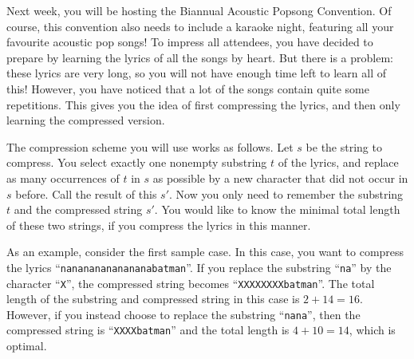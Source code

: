 




Next week, you will be hosting the Biannual Acoustic Popsong Convention.
Of course, this convention also needs to include a karaoke night, featuring all your favourite acoustic pop songs!
To impress all attendees, you have decided to prepare by learning the lyrics of all the songs by heart.
But there is a problem: these lyrics are very long,
so you will not have enough time left to learn all of this!
However, you have noticed that a lot of the songs contain quite some repetitions.
This gives you the idea of first compressing the lyrics, and then only learning the compressed version.

The compression scheme you will use works as follows.
Let $s$ be the string to compress.
You select exactly one nonempty substring $t$ of the lyrics,
and replace as many occurrences of $t$ in $s$ as possible by a new character that did not occur in $s$ before.
Call the result of this $s'$.
Now you only need to remember the substring $t$ and the compressed string $s'$.
You would like to know the minimal total length of these two strings, if you compress the lyrics in this manner.

As an example, consider the first sample case.
In this case, you want to compress the lyrics ``\texttt{nanananananananabatman}''.
If you replace the substring ``\texttt{na}'' by the character ``\texttt{X}'',
the compressed string becomes ``\texttt{XXXXXXXXbatman}''.
The total length of the substring and compressed string in this case is $2 + 14 = 16$.
However, if you instead choose to replace the substring ``\texttt{nana}'',
then the compressed string is ``\texttt{XXXXbatman}''
and the total length is $4 + 10 = 14$, which is optimal.

